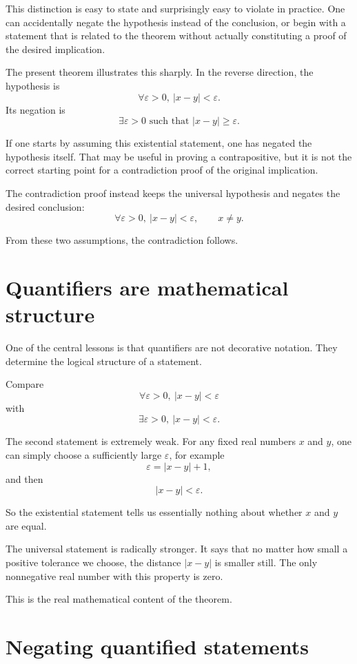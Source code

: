 \documentclass{essay}
\begin{document}
This distinction is easy to state and surprisingly easy to violate in practice. One can accidentally negate the hypothesis instead of the conclusion, or begin with a statement that is related to the theorem without actually constituting a proof of the desired implication.

The present theorem illustrates this sharply. In the reverse direction, the hypothesis is
\[
\forall \varepsilon>0,\ |x-y|<\varepsilon.
\]
Its negation is
\[
\exists \varepsilon>0
\text{ such that }
|x-y|\ge\varepsilon.
\]

If one starts by assuming this existential statement, one has negated the hypothesis itself. That may be useful in proving a contrapositive, but it is not the correct starting point for a contradiction proof of the original implication.

The contradiction proof instead keeps the universal hypothesis and negates the desired conclusion:
\[
\forall \varepsilon>0,\ |x-y|<\varepsilon,
\qquad
x\ne y.
\]

From these two assumptions, the contradiction follows.

\section{Quantifiers are mathematical structure}

One of the central lessons is that quantifiers are not decorative notation. They determine the logical structure of a statement.

Compare
\[
\forall \varepsilon>0,\ |x-y|<\varepsilon
\]
with
\[
\exists \varepsilon>0,\ |x-y|<\varepsilon.
\]

The second statement is extremely weak. For any fixed real numbers \(x\) and \(y\), one can simply choose a sufficiently large \(\varepsilon\), for example
\[
\varepsilon=|x-y|+1,
\]
and then
\[
|x-y|<\varepsilon.
\]

So the existential statement tells us essentially nothing about whether \(x\) and \(y\) are equal.

The universal statement is radically stronger. It says that no matter how small a positive tolerance we choose, the distance \(|x-y|\) is smaller still. The only nonnegative real number with this property is zero.

This is the real mathematical content of the theorem.

\section{Negating quantified statements}
\end{document}
